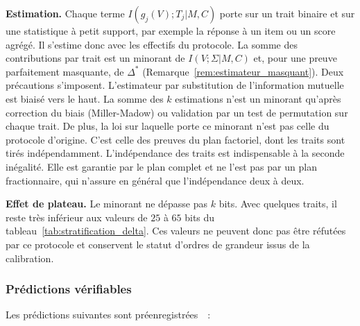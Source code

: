 \begin{sloppypar}
\noindent\textbf{Estimation.} Chaque terme $I(g_j(V);T_j|M,C)$ porte sur un trait binaire
et sur une statistique \`a petit support, par exemple la r\'eponse \`a un item ou un score
agr\'eg\'e. Il s'estime donc avec les effectifs du protocole. La somme des contributions
par trait est un minorant de $I(V;\Sigma|M,C)$ et, pour une preuve parfaitement
masquante, de $\Delta^*$ (Remarque~\ref{rem:estimateur_masquant}). Deux pr\'ecautions
s'imposent. L'estimateur par substitution de l'information mutuelle est biais\'e vers le
haut. La somme des $k$ estimations n'est un minorant qu'apr\`es correction du
biais (Miller-Madow) ou validation par un test de permutation sur chaque trait. De plus,
la loi sur laquelle porte ce minorant n'est pas celle du protocole d'origine. C'est celle des preuves du plan factoriel, dont les
traits sont tir\'es ind\'ependamment. L'ind\'ependance des traits
est indispensable \`a la seconde in\'egalit\'e. Elle est garantie par le plan complet et
ne l'est pas par un plan fractionnaire, qui n'assure en g\'en\'eral que l'ind\'ependance
deux \`a deux.

\noindent\textbf{Effet de plateau.} Le minorant ne d\'epasse pas $k$ bits. Avec quelques
traits, il reste tr\`es inf\'erieur aux valeurs de $25$ \`a $65$ bits du
tableau~\ref{tab:stratification_delta}. Ces valeurs ne peuvent donc pas \^etre r\'efut\'ees
par ce protocole et conservent le statut d'ordres de grandeur issus de la
calibration.

\subsubsection{Pr\'edictions v\'erifiables}
\label{subsubsec:predictions_delta}

Les pr\'edictions suivantes sont
pr\'eenregistr\'ees~\cite{MINKA2026CRO,MINKA2026SOTP}~:


\end{sloppypar}
